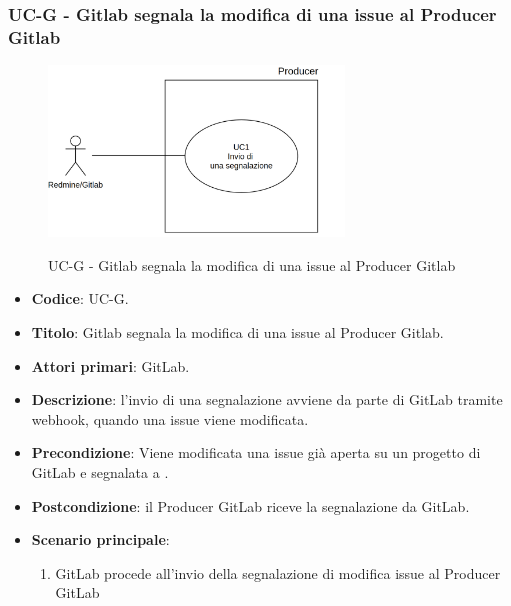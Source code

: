 	\subsubsection{UC\theuccount-G - Gitlab segnala la modifica di una issue al Producer Gitlab}
	\begin{figure}[H]
		\centering
		\includegraphics[width=0.7\textwidth]{img/UC1.png}\\
		\caption{UC\theuccount-G - Gitlab segnala la modifica di una issue al Producer Gitlab}
	\end{figure}
	\begin{itemize}
		\item \textbf{Codice}: UC\theuccount-G.
		\item \textbf{Titolo}: Gitlab segnala la modifica di una issue al Producer Gitlab.
		\item \textbf{Attori primari}: GitLab.
		\item \textbf{Descrizione}: l'invio di una segnalazione avviene
		da parte di GitLab tramite webhook, quando una issue viene modificata.
		\item \textbf{Precondizione}: Viene modificata una issue già aperta su un
		progetto di GitLab e segnalata a \progetto.
		\item \textbf{Postcondizione}: il Producer GitLab riceve la segnalazione da GitLab.
		\item \textbf{Scenario principale}: 
		\begin{enumerate}
			\item GitLab procede all'invio della segnalazione di modifica issue al Producer GitLab
		\end{enumerate}
		
	\end{itemize}
